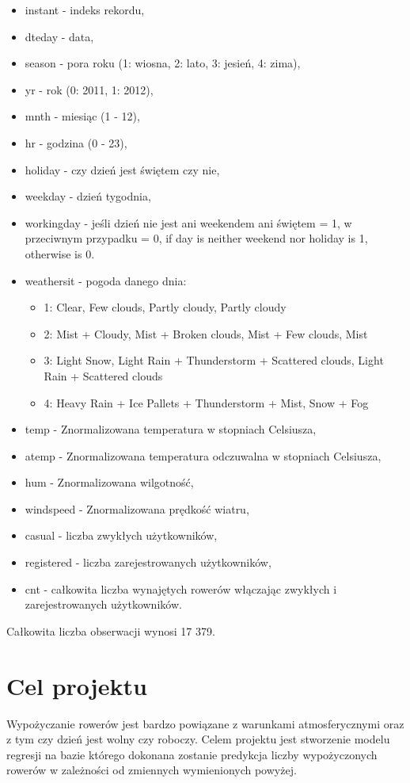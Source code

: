 \documentclass[12pt]{article}
\begin{document}
\begin{itemize}

\item instant - indeks rekordu,
\item dteday - data,
\item season - pora roku (1: wiosna, 2: lato, 3: jesień, 4: zima),
\item yr - rok (0: 2011, 1: 2012),
\item mnth - miesiąc (1 - 12),
\item hr - godzina (0 - 23),
\item holiday - czy dzień jest świętem czy nie,
\item weekday - dzień tygodnia,
\item workingday - jeśli dzień nie jest ani weekendem ani świętem = 1, w przeciwnym przypadku = 0, if day is neither weekend nor holiday is 1, otherwise is 0.
\item  weathersit - pogoda danego dnia: 
\begin{itemize}
	\item 1: Clear, Few clouds, Partly cloudy, Partly cloudy
	\item 2: Mist + Cloudy, Mist + Broken clouds, Mist + Few clouds, Mist
	\item 3: Light Snow, Light Rain + Thunderstorm + Scattered clouds, Light Rain + Scattered clouds
	\item 4: Heavy Rain + Ice Pallets + Thunderstorm + Mist, Snow + Fog
\end{itemize}
\item temp - Znormalizowana temperatura w stopniach Celsiusza, 
\item atemp - Znormalizowana temperatura odczuwalna w stopniach Celsiusza,
\item hum - Znormalizowana wilgotność,
\item windspeed - Znormalizowana prędkość wiatru,
\item casual - liczba zwykłych użytkowników,
\item registered - liczba zarejestrowanych użytkowników,
\item cnt - całkowita liczba wynajętych rowerów włączając zwykłych i zarejestrowanych użytkowników.

\end{itemize}

Całkowita liczba obserwacji wynosi 17 379.

\section{Cel projektu}

\hspace{7mm} Wypożyczanie rowerów jest bardzo powiązane z warunkami atmosferycznymi oraz z tym czy dzień jest wolny czy roboczy. Celem projektu jest stworzenie modelu regresji na bazie którego dokonana zostanie predykcja liczby wypożyczonych rowerów w zależności od zmiennych wymienionych powyżej. 
\end{document}
